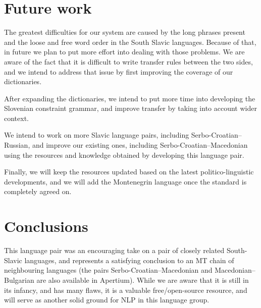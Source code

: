 \section{Future work}

The greatest difficulties for our system are caused by the long phrases present 
and the loose and free word order in the South Slavic languages.
Because of that, in future we plan to put more effort into dealing with those problems.
We are aware of the fact that it is difficult to write transfer rules between the two sides,
and we intend to address that issue by first improving the coverage of our dictionaries.

After expanding the dictionaries, we intend to put more time into developing the Slovenian constraint grammar,
and improve transfer by taking into account wider context.

We intend to work on more Slavic language pairs, including Serbo-Croatian--Russian,
and improve our existing ones, including Serbo-Croatian--Macedonian \citep{peradin12} using the 
resources and knowledge obtained by developing this language pair.

Finally, we will keep the resources updated based on the latest politico-linguistic developments,
and we will add the Montenegrin language once the standard is completely agreed on.



\section{Conclusions}

This language pair was an encouraging take on a pair of closely
related South-Slavic languages, and represents a satisfying conclusion
to an MT chain of neighbouring languages (the pairs Serbo-Croatian--Macedonian 
and Macedonian--Bulgarian are also available in Apertium). While we are aware that it
is still in its infancy, and has many flaws, it is a valuable
free/open-source resource, and will serve as another solid ground for NLP
in this language group.

